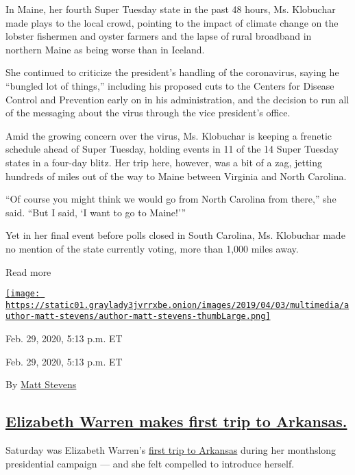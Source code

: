 In Maine, her fourth Super Tuesday state in the past 48 hours, Ms.
Klobuchar made plays to the local crowd, pointing to the impact of
climate change on the lobster fishermen and oyster farmers and the lapse
of rural broadband in northern Maine as being worse than in Iceland.

She continued to criticize the president's handling of the coronavirus,
saying he ``bungled lot of things,'' including his proposed cuts to the
Centers for Disease Control and Prevention early on in his
administration, and the decision to run all of the messaging about the
virus through the vice president's office.

Amid the growing concern over the virus, Ms. Klobuchar is keeping a
frenetic schedule ahead of Super Tuesday, holding events in 11 of the 14
Super Tuesday states in a four-day blitz. Her trip here, however, was a
bit of a zag, jetting hundreds of miles out of the way to Maine between
Virginia and North Carolina.

``Of course you might think we would go from North Carolina from
there,'' she said. ``But I said, `I want to go to Maine!'''

Yet in her final event before polls closed in South Carolina, Ms.
Klobuchar made no mention of the state currently voting, more than 1,000
miles away.

Read more

\href{https://www.nytimes3xbfgragh.onion/by/matt-stevens}{\texttt{[image: https://static01.graylady3jvrrxbe.onion/images/2019/04/03/multimedia/author-matt-stevens/author-matt-stevens-thumbLarge.png]}}

Feb. 29, 2020, 5:13 p.m. ET

Feb. 29, 2020, 5:13 p.m. ET

By \href{https://www.nytimes3xbfgragh.onion/by/matt-stevens}{Matt
Stevens}

\hypertarget{elizabeth-warren-makes-first-trip-to-arkansas}{%
\subsection{\texorpdfstring{\protect\hyperlink{elizabeth-warren-makes-first-trip-to-arkansas}{Elizabeth
Warren makes first trip to
Arkansas.}}{Elizabeth Warren makes first trip to Arkansas.}}\label{elizabeth-warren-makes-first-trip-to-arkansas}}

Saturday was Elizabeth Warren's
\href{https://twitter.com/KristenOrthman/status/1233839092317802496}{first
trip to Arkansas} during her monthslong presidential campaign --- and
she felt compelled to introduce herself.

